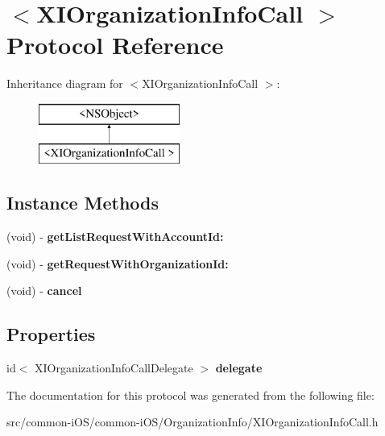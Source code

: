 \hypertarget{protocol_x_i_organization_info_call_01-p}{}\section{$<$X\+I\+Organization\+Info\+Call $>$ Protocol Reference}
\label{protocol_x_i_organization_info_call_01-p}
Inheritance diagram for $<$X\+I\+Organization\+Info\+Call $>$\+:\begin{figure}[H]
\begin{center}
\leavevmode
\includegraphics[height=2.000000cm]{protocol_x_i_organization_info_call_01-p}
\end{center}
\end{figure}
\subsection*{Instance Methods}
\begin{DoxyCompactItemize}
\item 
\hypertarget{protocol_x_i_organization_info_call_01-p_a4dbb1fccbead71590f52f42074a40664}{}\label{protocol_x_i_organization_info_call_01-p_a4dbb1fccbead71590f52f42074a40664} 
(void) -\/ {\bfseries get\+List\+Request\+With\+Account\+Id\+:}
\item 
\hypertarget{protocol_x_i_organization_info_call_01-p_ac88b03d99a56002c94624230098604d6}{}\label{protocol_x_i_organization_info_call_01-p_ac88b03d99a56002c94624230098604d6} 
(void) -\/ {\bfseries get\+Request\+With\+Organization\+Id\+:}
\item 
\hypertarget{protocol_x_i_organization_info_call_01-p_ae2cdf5e45767606e7955adef684dc51e}{}\label{protocol_x_i_organization_info_call_01-p_ae2cdf5e45767606e7955adef684dc51e} 
(void) -\/ {\bfseries cancel}
\end{DoxyCompactItemize}
\subsection*{Properties}
\begin{DoxyCompactItemize}
\item 
\hypertarget{protocol_x_i_organization_info_call_01-p_a7c35e390a7ad81200503ad5fd56fc3b5}{}\label{protocol_x_i_organization_info_call_01-p_a7c35e390a7ad81200503ad5fd56fc3b5} 
id$<$ X\+I\+Organization\+Info\+Call\+Delegate $>$ {\bfseries delegate}
\end{DoxyCompactItemize}


The documentation for this protocol was generated from the following file\+:\begin{DoxyCompactItemize}
\item 
src/common-\/i\+O\+S/common-\/i\+O\+S/\+Organization\+Info/X\+I\+Organization\+Info\+Call.\+h\end{DoxyCompactItemize}
